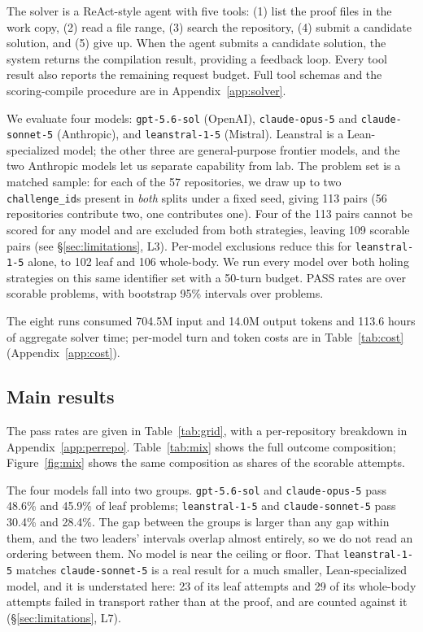 \documentclass{article}
\begin{document}
The solver is a ReAct-style agent \cite{yao2023react} with five tools: (1) list the proof files in the work copy, (2) read a file range, (3) search the repository, (4) submit a candidate solution, and (5) give up. When the agent submits a candidate solution, the system returns the compilation result, providing a feedback loop. Every tool result also reports the remaining request budget. Full tool schemas and the scoring-compile procedure are in Appendix~\ref{app:solver}.

We evaluate four models: \texttt{gpt-5.6-sol} (OpenAI), \texttt{claude-opus-5} and \texttt{claude-sonnet-5} (Anthropic), and \texttt{leanstral-1-5} (Mistral). Leanstral is a Lean-specialized model; the other three are general-purpose frontier models, and the two Anthropic models let us separate capability from lab. The problem set is a matched sample: for each of the 57 repositories, we draw up to two \texttt{challenge\_id}s present in \emph{both} splits under a fixed seed, giving 113 pairs (56 repositories contribute two, one contributes one). Four of the 113 pairs cannot be scored for any model and are excluded from both strategies, leaving 109 scorable pairs (see \S\ref{sec:limitations}, L3). Per-model exclusions reduce this for \texttt{leanstral-1-5} alone, to 102 leaf and 106 whole-body. We run every model over both holing strategies on this same identifier set with a 50-turn budget. PASS rates are over scorable problems, with bootstrap 95\% intervals over problems.

The eight runs consumed 704.5M input and 14.0M output tokens and 113.6 hours of aggregate solver time; per-model turn and token costs are in Table~\ref{tab:cost} (Appendix~\ref{app:cost}).

\subsection{Main results}
\label{sec:grid}

The pass rates are given in Table~\ref{tab:grid}, with a per-repository breakdown in Appendix~\ref{app:perrepo}. Table~\ref{tab:mix} shows the full outcome composition; Figure~\ref{fig:mix} shows the same composition as shares of the scorable attempts.

The four models fall into two groups. \texttt{gpt-5.6-sol} and \texttt{claude-opus-5} pass 48.6\% and 45.9\% of leaf problems; \texttt{leanstral-1-5} and \texttt{claude-sonnet-5} pass 30.4\% and 28.4\%. The gap between the groups is larger than any gap within them, and the two leaders' intervals overlap almost entirely, so we do not read an ordering between them. No model is near the ceiling or floor. That \texttt{leanstral-1-5} matches \texttt{claude-sonnet-5} is a real result for a much smaller, Lean-specialized model, and it is understated here: 23 of its leaf attempts and 29 of its whole-body attempts failed in transport rather than at the proof, and are counted against it (\S\ref{sec:limitations}, L7).
\end{document}
